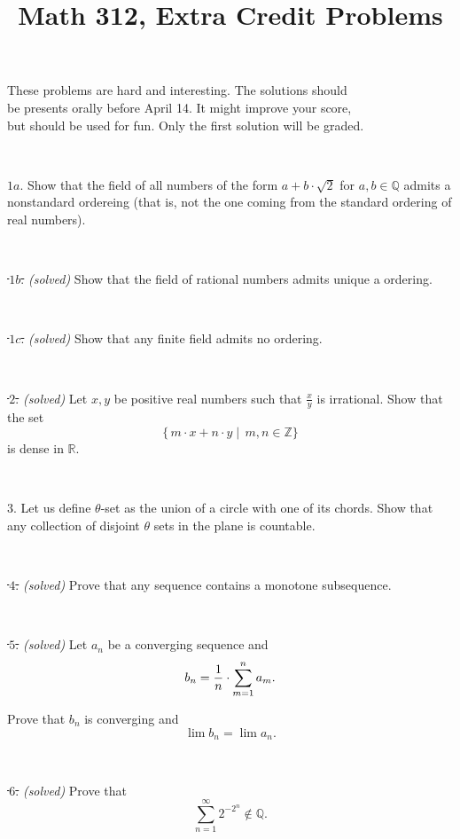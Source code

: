 \documentclass{article}
\def\noi{\noindent}%
\def\RR{\mathbb{R}}%
\def\ZZ{\mathbb{Z}}%
\def\QQ{\mathbb{Q}}%
\begin{document}
\title{Math 312, Extra Credit Problems}
\author{}
\date{}
\maketitle

\begin{center}
{\small These problems are hard and interesting. The solutions should \\
be presents orally before April 14. It might improve your score,\\
but should be used for fun. Only the first solution will be graded.}
\end{center}
\thispagestyle{empty}

\ 

\noi $1a$. Show that the field of all numbers of the form $a+b\cdot\sqrt{2}$ for $a,b\in \QQ$ admits a nonstandard ordereing (that is, not the one coming from the standard ordering of real numbers).

\ 

\noi \sout{\,$1b$.} \textit{(solved)} Show that the field of rational numbers admits unique a ordering.

\ 

\noi \sout{\,$1c$.} \textit{(solved)} Show that any finite field admits no ordering.

\ 

\noi \sout{\,$2$.} \textit{(solved)} Let $x,y$ be positive real numbers such that $\tfrac xy$ is irrational.
Show that the set 
\[\{\,m{\cdot} x+n{\cdot} y\mid\,m,n\in\ZZ\}\] 
is dense in $\RR$.

\ 

\noi $3$. Let us define $\theta$-set as the union of a circle with one of its chords.
Show that any collection of disjoint $\theta$ sets in the plane is countable.

\ 

\noi \sout{\,$4$.} \textit{(solved)}  Prove that any sequence contains a monotone subsequence.

\ 

\noi \sout{\,$5$.} \textit{(solved)} Let $a_n$ be a converging sequence and 
$$b_n={1\over n}\cdot\sum_{m=1}^n a_m.$$

Prove that $b_n$ is converging and 
$$\lim b_n=\lim a_n.$$

\ 

\noi \sout{\,$6$.} \textit{(solved)} Prove that 
$$\sum_{n=1}^\infty 2^{-2^n}\not\in \QQ.$$

\ 
\end{document}
